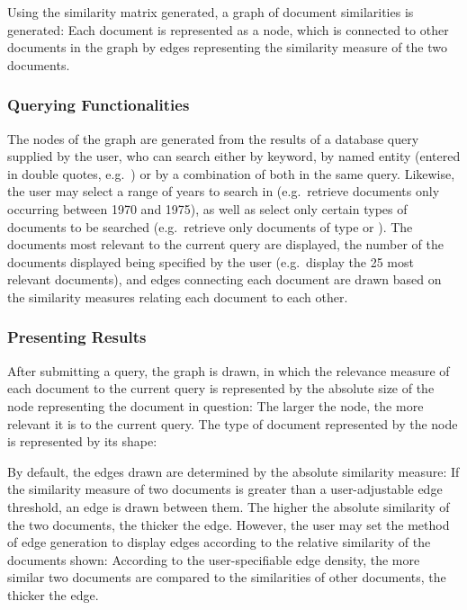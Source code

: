 
Using the similarity matrix generated, a graph of document similarities is generated: Each document is represented as a node, which is connected to other documents in the graph by edges representing the similarity measure of the two documents.

\subsubsection {Querying Functionalities}
\label{sec:querying_functionalities}
The nodes of the graph are generated from the results of a database query supplied by the user, who can search either by keyword, by named entity (entered in double quotes, e.g.\ ) or by a combination of both in the same query. Likewise, the user may select a range of years to search in (e.g.\ retrieve documents only occurring between 1970 and 1975), as well as select only certain types of documents to be searched (e.g.\ retrieve only documents of type  or ). The documents most relevant to the current query are displayed, the number of the documents displayed being specified by the user (e.g.\ display the 25 most relevant documents), and edges connecting each document are drawn based on the similarity measures relating each document to each other.

\subsubsection {Presenting Results}
\label{sec:presenting_results}
After submitting a query, the graph is drawn, in which the relevance measure of each document to the current query is represented by the absolute size of the node representing the document in question: The larger the node, the more relevant it is to the current query. The type of document represented by the node is represented by its shape: 

By default, the edges drawn are determined by the absolute similarity measure: If the similarity measure of two documents is greater than a user-adjustable edge threshold, an edge is drawn between them. The higher the absolute similarity of the two documents, the thicker the edge. However, the user may set the method of edge generation to display edges according to the relative similarity of the documents shown: According to the user-specifiable edge density, the more similar two documents are compared to the similarities of other documents, the thicker the edge.

